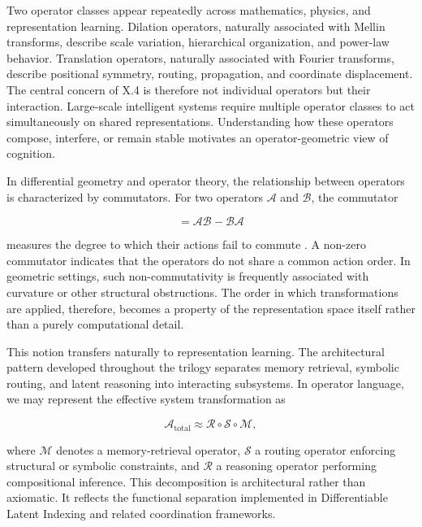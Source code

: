 Two operator classes appear repeatedly across mathematics, physics, and representation learning. Dilation operators, naturally associated with Mellin transforms, describe scale variation, hierarchical organization, and power-law behavior. Translation operators, naturally associated with Fourier transforms, describe positional symmetry, routing, propagation, and coordinate displacement. The central concern of X.4 is therefore not individual operators but their interaction. Large-scale intelligent systems require multiple operator classes to act simultaneously on shared representations. Understanding how these operators compose, interfere, or remain stable motivates an operator-geometric view of cognition.

In differential geometry and operator theory, the relationship between operators is characterized by commutators. For two operators $\mathcal{A}$ and $\mathcal{B}$, the commutator

\begin{equation}
[\mathcal{A},\mathcal{B}] = \mathcal{A}\mathcal{B} - \mathcal{B}\mathcal{A}
\end{equation}

measures the degree to which their actions fail to commute \cite{nakahara2003geometry}. A non-zero commutator indicates that the operators do not share a common action order. In geometric settings, such non-commutativity is frequently associated with curvature or other structural obstructions. The order in which transformations are applied, therefore, becomes a property of the representation space itself rather than a purely computational detail.

This notion transfers naturally to representation learning. The architectural pattern developed throughout the trilogy separates memory retrieval, symbolic routing, and latent reasoning into interacting subsystems. In operator language, we may represent the effective system transformation as

\begin{equation}
\mathcal{A}_{\text{total}} \approx \mathcal{R} \circ \mathcal{S} \circ \mathcal{M},
\end{equation}

where $\mathcal{M}$ denotes a memory-retrieval operator, $\mathcal{S}$ a routing operator enforcing structural or symbolic constraints, and $\mathcal{R}$ a reasoning operator performing compositional inference. This decomposition is architectural rather than axiomatic. It reflects the functional separation implemented in Differentiable Latent Indexing and related coordination frameworks.

